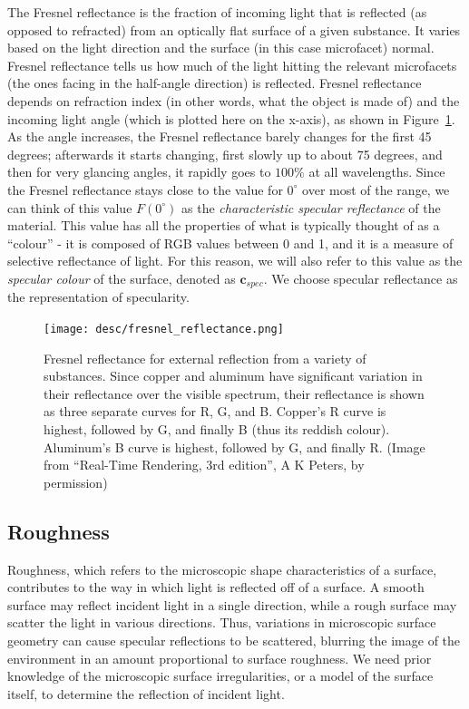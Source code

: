 The Fresnel reflectance is the fraction of incoming light that is reflected (as opposed to refracted) from an optically flat surface of a given substance. It varies based on the light direction and the surface (in this case microfacet) normal. Fresnel reflectance tells us how much of the light hitting the relevant microfacets (the ones facing in the half-angle direction) is reflected. Fresnel reflectance depends on refraction index (in other words, what the object is made of) and the incoming light angle (which is plotted here on the x-axis), as shown in Figure~\ref{fig:fresnel_reflectance}. As the angle increases, the Fresnel reflectance barely changes for the first 45 degrees; afterwards it starts changing, first slowly up to about 75 degrees, and then for very glancing angles, it rapidly goes to $100\%$ at all wavelengths. Since the Fresnel reflectance stays close to the value for $0^\circ$ over most of the range, we can think of this value $F(0^\circ)$ as the \textit{characteristic specular reflectance} of the material. This value has all the properties of what is typically thought of as a ``colour'' - it is composed of RGB values between 0 and 1, and it is a measure of selective reflectance of light. For this reason, we will also refer to this value as the \textit{specular colour} of the surface, denoted as $\mathbf{c}_{spec}$. We choose specular reflectance as the representation of specularity.
\begin{figure}[!htbp]
\centering
\texttt{[image: desc/fresnel\_reflectance.png]}
\caption{Fresnel reflectance for external reflection from a variety of substances. Since copper and aluminum have significant variation in their reflectance over the visible spectrum, their reflectance is shown as three separate curves for R, G, and B. Copper's R curve is highest, followed by G, and finally B (thus its reddish colour). Aluminum's B curve is highest, followed by G, and finally R. (Image from ``Real-Time Rendering, 3rd edition'',  A K Peters, by permission)}
\label{fig:fresnel_reflectance}
\end{figure}

\subsection{Roughness}
Roughness, which refers to the microscopic shape characteristics of a surface, contributes to the way in which light is reflected off of a surface. A smooth surface may reflect incident light in a single direction, while a rough surface may scatter the light in various directions. Thus, variations in microscopic surface geometry can cause specular reflections to be scattered, blurring the image of the environment in an amount proportional to surface roughness. We need prior knowledge of the microscopic surface irregularities, or a model of the surface itself, to determine the reflection of incident light.

